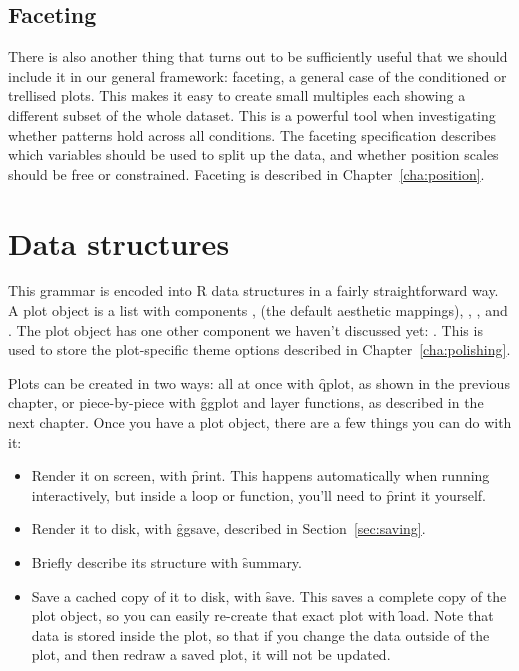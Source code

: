 \subsection{Faceting}\label{sec:intro-faceting}

There is also another thing that turns out to be sufficiently useful that we should include it in our general framework: faceting, a general case of the conditioned or trellised plots. This makes it easy to create small multiples each showing a different subset of the whole dataset. This is a powerful tool when investigating whether patterns hold across all conditions. The faceting specification describes which variables should be used to split up the data, and whether position scales should be free or constrained. Faceting is described in Chapter~\ref{cha:position}.

\section{Data structures}
\label{sec:data-structures}

This grammar is encoded into R data structures in a fairly straightforward way. A plot object is a list with components ,  (the default aesthetic mappings), , ,  and . The plot object has one other component we haven't discussed yet: . This is used to store the plot-specific theme options described in Chapter~\ref{cha:polishing}. 

Plots can be created in two ways: all at once with \f{qplot}, as shown in the previous chapter, or piece-by-piece with \f{ggplot} and layer functions, as described in the next chapter.  Once you have a plot object, there are a few things you can do with it:

\begin{itemize}
  \item Render it on screen, with \f{print}.  This happens automatically when
  running interactively, but inside a loop or function, you'll need to
  \f{print} it yourself. 
  
  \item Render it to disk, with \f{ggsave}, described in Section~\ref{sec:saving}.

  \item Briefly describe its structure with \f{summary}. 
  
  \item Save a cached copy of it to disk, with \f{save}.  This saves a complete copy of the plot object, so you can easily re-create that exact plot with \f{load}.  Note that data is stored inside the plot, so that if you change the data outside of the plot, and then redraw a saved plot, it will not be updated.   
\end{itemize}

